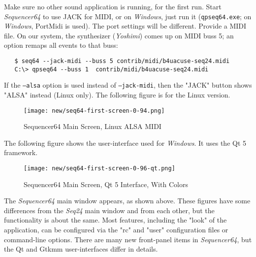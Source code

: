 \documentclass[
 11pt,
 twoside,
 a4paper,
 headinclude,
 footinclude,
 final                                 %
]{article}
\begin{document}
   Make sure no other sound application is running, for the first run.
   Start \textsl{Sequencer64} to use JACK for MIDI, or
   on \textsl{Windows}, just run it (\texttt{qpseq64.exe};
   on \textsl{Windows}, PortMidi is used). The port
   settings will be different.  Provide a MIDI file.
   On our system, the synthesizer
   (\textsl{Yoshimi}) comes up on MIDI buss 5; an option remaps
   all events to that buss:

\begin{verbatim}
   $ seq64 --jack-midi --buss 5 contrib/midi/b4uacuse-seq24.midi
   C:\> qpseq64 --buss 1  contrib/midi/b4uacuse-seq24.midi
\end{verbatim}

   If the \texttt{--alsa} option is used instead of
   \texttt{--jack-midi}, then the "JACK" button shows "ALSA" instead
   (Linux only).  The following figure is for the Linux
   version.

\begin{figure}[H]
   \centering 
   \texttt{[image: new/seq64-first-screen-0-94.png]}
   \caption{Sequencer64 Main Screen, Linux ALSA MIDI}
   \label{fig:seq64_main_screen}
\end{figure}

   The following figure shows the user-interface used for
   \textsl{Windows}.  It uses the Qt 5 framework.

\begin{figure}[H]
   \centering 
   \texttt{[image: new/seq64-first-screen-0-96-qt.png]}
   \caption{Sequencer64 Main Screen, Qt 5 Interface, With Colors}
   \label{fig:seq64_main_screen_qt}
\end{figure}

   The \textsl{Sequencer64} main window appears, as shown above.
   These figures have some differences from the \textsl{Seq24} main window
   and from each other, but the functionality is about the same.
   Most features, including the "look" of the application,
   can be configured via the "rc" and "user"
   configuration files or command-line options.
   There are many new front-panel items in \textsl{Sequencer64}, but
   the Qt and Gtkmm user-interfaces differ in details.
\end{document}
